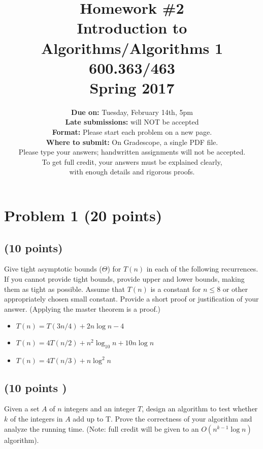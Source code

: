 \documentclass[letterpaper, 11pt]{article}
\begin{document}
\title{Homework \#2 \\ Introduction to Algorithms/Algorithms 1 \\ 600.363/463 \\Spring 2017}
\author{\textbf{Due on:} Tuesday, February 14th, 5pm \\
\textbf{Late submissions:} will NOT be accepted\\
\textbf{Format:} Please start each problem on a new page.
\\\textbf{Where to submit:} On Gradescope, a single PDF file.
\\ Please type your answers; handwritten assignments will not be accepted.
\\ To get full credit, your answers must be explained clearly,\\ with enough details
and rigorous proofs.
\\}

\maketitle


\section{Problem 1 (20 points)} %
\subsection{(10 points)}
Give tight asymptotic bounds ($\Theta$) for $T(n)$ in each of the following recurrences. If you cannot provide tight bounds, provide upper and lower bounds, making them as tight as possible. Assume that $T(n)$ is a constant for $n \le 8$ or other appropriately chosen small constant. Provide a short proof or justification of your answer. (Applying the master theorem is a proof.)
\begin{itemize}
\item $T(n) = T(3n/4) + 2n \log n - 4$
\item $T(n) = 4T(n/2) + n^2 \log_{10} n + 10 n \log n$
\item $T(n) = 4T(n/3) + n \log^2 n$
\end{itemize}


\subsection{(10 points )}
Given a set $A$ of $n$ integers and an integer $T$, design an algorithm to test whether $k$ of the integers in $A$ add up to T.
Prove the correctness of your algorithm and analyze the running time. (Note: full credit will be given to an $O(n^{k-1} \log n)$ algorithm).
\end{document}
